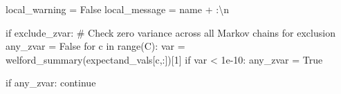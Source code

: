 \documentclass[
  letterpaper,
  DIV=11,
  numbers=noendperiod]{scrartcl}
\newenvironment{Shaded}{\begin{snugshade}}{\end{snugshade}}
\newcommand{\BuiltInTok}[1]{\textcolor[rgb]{0.00,0.23,0.31}{#1}}
\newcommand{\CharTok}[1]{\textcolor[rgb]{0.13,0.47,0.30}{#1}}
\newcommand{\CommentTok}[1]{\textcolor[rgb]{0.37,0.37,0.37}{#1}}
\newcommand{\ControlFlowTok}[1]{\textcolor[rgb]{0.00,0.23,0.31}{#1}}
\newcommand{\DecValTok}[1]{\textcolor[rgb]{0.68,0.00,0.00}{#1}}
\newcommand{\FloatTok}[1]{\textcolor[rgb]{0.68,0.00,0.00}{#1}}
\newcommand{\KeywordTok}[1]{\textcolor[rgb]{0.00,0.23,0.31}{#1}}
\newcommand{\NormalTok}[1]{\textcolor[rgb]{0.00,0.23,0.31}{#1}}
\newcommand{\OperatorTok}[1]{\textcolor[rgb]{0.37,0.37,0.37}{#1}}
\newcommand{\StringTok}[1]{\textcolor[rgb]{0.13,0.47,0.30}{#1}}
\newcommand{\VariableTok}[1]{\textcolor[rgb]{0.07,0.07,0.07}{#1}}
\begin{document}
\begin{Shaded}
\begin{Highlighting}[]
\NormalTok{    local\_warning }\OperatorTok{=} \VariableTok{False}
\NormalTok{    local\_message }\OperatorTok{=}\NormalTok{ name }\OperatorTok{+} \StringTok{\textquotesingle{}:}\CharTok{\textbackslash{}n}\StringTok{\textquotesingle{}}

    \ControlFlowTok{if}\NormalTok{ exclude\_zvar:}
      \CommentTok{\# Check zero variance across all Markov chains for exclusion}
\NormalTok{      any\_zvar }\OperatorTok{=} \VariableTok{False}
      \ControlFlowTok{for}\NormalTok{ c }\KeywordTok{in} \BuiltInTok{range}\NormalTok{(C):}
\NormalTok{        var }\OperatorTok{=}\NormalTok{ welford\_summary(expectand\_vals[c,:])[}\DecValTok{1}\NormalTok{]}
        \ControlFlowTok{if}\NormalTok{ var }\OperatorTok{\textless{}} \FloatTok{1e{-}10}\NormalTok{:}
\NormalTok{          any\_zvar }\OperatorTok{=} \VariableTok{True}

      \ControlFlowTok{if}\NormalTok{ any\_zvar:}
        \ControlFlowTok{continue}


\end{Highlighting}
\end{Shaded}
\end{document}
